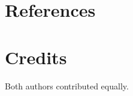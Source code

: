 \documentclass[12pt,fleqn]{article}
\begin{document}


\section{References}






\section{Credits}
Both authors contributed equally.
\end{document}
